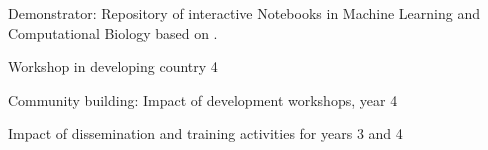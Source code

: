 \begin{workpackage}
\begin{wpdelivs}
 \begin{wpdeliv}[due=44,id=notebook-repo,dissem=PU,nature=DEM,lead=USH]{Demonstrator: Repository of interactive Notebooks in Machine Learning and Computational Biology based on \TheProject.}\end{wpdeliv}
 \begin{wpdeliv}[due=48,id=developing-countries4,dissem=PU,nature=DEM,lead=UB]{Workshop in developing country 4} \end{wpdeliv}
 \begin{wpdeliv}[due=48,id=workshops-4,dissem=PU,nature=R]{Community building: Impact of development workshops, year 4}\end{wpdeliv}   
 \begin{wpdeliv}[due=48,id=dissem-2,dissem=PU,nature=R]{Impact of dissemination and training activities for years 3 and 4}\end{wpdeliv}  

\end{wpdelivs}


\end{workpackage}


